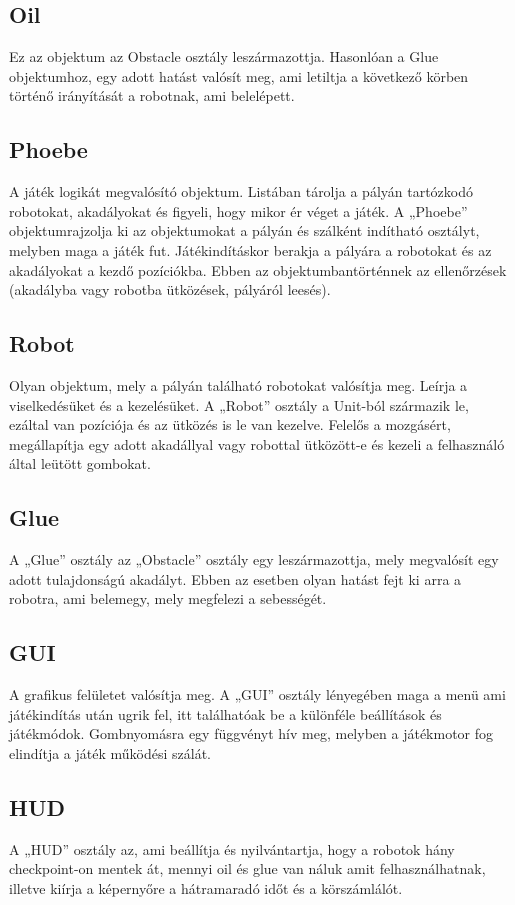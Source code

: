 \subsection{Oil}
Ez az objektum az Obstacle osztály leszármazottja. Hasonlóan a Glue objektumhoz, egy adott hatást valósít meg, ami letiltja a következő körben történő irányítását a robotnak, ami belelépett.
\subsection{Phoebe}
A játék logikát megvalósító objektum. Listában tárolja a pályán tartózkodó robotokat, akadályokat és figyeli, hogy mikor ér véget a játék. A „Phoebe” objektumrajzolja ki az objektumokat a pályán és szálként indítható osztályt, melyben maga a játék fut. Játékindításkor berakja a pályára a robotokat és az akadályokat a kezdő pozíciókba. Ebben az objektumbantörténnek az ellenőrzések (akadályba vagy robotba ütközések, pályáról leesés).
\subsection{Robot}
Olyan objektum, mely a pályán található robotokat valósítja meg. Leírja a viselkedésüket és a kezelésüket. A „Robot” osztály a Unit-ból származik le, ezáltal van pozíciója és az ütközés is le van kezelve. Felelős a mozgásért, megállapítja egy adott akadállyal vagy robottal ütközött-e és kezeli a felhasználó által leütött gombokat.

\subsection{Glue}
A „Glue” osztály az „Obstacle” osztály egy leszármazottja, mely megvalósít egy adott tulajdonságú akadályt. Ebben az esetben olyan hatást fejt ki arra a robotra, ami belemegy, mely megfelezi a sebességét.
\subsection{GUI}
A grafikus felületet valósítja meg. A „GUI” osztály lényegében maga a menü ami játékindítás után ugrik fel, itt találhatóak be a különféle beállítások és játékmódok. Gombnyomásra egy függvényt hív meg, melyben a játékmotor fog elindítja a játék működési szálát.
\subsection{HUD}
A „HUD” osztály az, ami beállítja és nyilvántartja, hogy a robotok hány checkpoint-on mentek át, mennyi oil és glue van náluk amit felhasználhatnak, illetve kiírja a képernyőre a hátramaradó időt és a körszámlálót.
